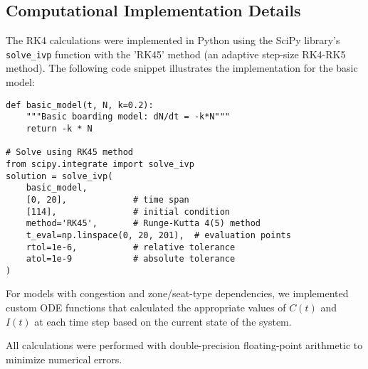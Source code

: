 \subsection{Computational Implementation Details}

The RK4 calculations were implemented in Python using the SciPy library's \texttt{solve\_ivp} function with the 'RK45' method (an adaptive step-size RK4-RK5 method). The following code snippet illustrates the implementation for the basic model:

\begin{verbatim}
def basic_model(t, N, k=0.2):
    """Basic boarding model: dN/dt = -k*N"""
    return -k * N

# Solve using RK45 method
from scipy.integrate import solve_ivp
solution = solve_ivp(
    basic_model,
    [0, 20],             # time span
    [114],               # initial condition
    method='RK45',       # Runge-Kutta 4(5) method
    t_eval=np.linspace(0, 20, 201),  # evaluation points
    rtol=1e-6,           # relative tolerance
    atol=1e-9            # absolute tolerance
)
\end{verbatim}

For models with congestion and zone/seat-type dependencies, we implemented custom ODE functions that calculated the appropriate values of $C(t)$ and $I(t)$ at each time step based on the current state of the system.

All calculations were performed with double-precision floating-point arithmetic to minimize numerical errors.